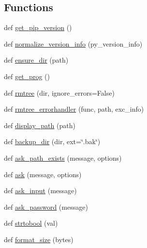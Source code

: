 \subsection*{Functions}
\begin{DoxyCompactItemize}
\item 
def \hyperlink{namespacepip_1_1__internal_1_1utils_1_1misc_a0fe392b2b98197ae4fcf878757c32c71}{get\+\_\+pip\+\_\+version} ()
\item 
def \hyperlink{namespacepip_1_1__internal_1_1utils_1_1misc_a6b617962ff695a9a8dd904b9823f816f}{normalize\+\_\+version\+\_\+info} (py\+\_\+version\+\_\+info)
\item 
def \hyperlink{namespacepip_1_1__internal_1_1utils_1_1misc_afaf6195b8068b1a08c9b6bb51384b7d0}{ensure\+\_\+dir} (path)
\item 
def \hyperlink{namespacepip_1_1__internal_1_1utils_1_1misc_a7385d557b125e0ab0dfdec9a66951838}{get\+\_\+prog} ()
\item 
def \hyperlink{namespacepip_1_1__internal_1_1utils_1_1misc_a468943eb596f19a944215297ab3b9216}{rmtree} (dir, ignore\+\_\+errors=False)
\item 
def \hyperlink{namespacepip_1_1__internal_1_1utils_1_1misc_a68fb568d1b03462b7bcf87103141bedb}{rmtree\+\_\+errorhandler} (func, path, exc\+\_\+info)
\item 
def \hyperlink{namespacepip_1_1__internal_1_1utils_1_1misc_a2c56db5ea4bfcb80d54a94f1eb975454}{display\+\_\+path} (path)
\item 
def \hyperlink{namespacepip_1_1__internal_1_1utils_1_1misc_a77c1deb16207f71d1df9cd37a2af6e80}{backup\+\_\+dir} (dir, ext=\char`\"{}.bak\char`\"{})
\item 
def \hyperlink{namespacepip_1_1__internal_1_1utils_1_1misc_a0a9a745c582de6c64b9f832d515ae17a}{ask\+\_\+path\+\_\+exists} (message, options)
\item 
def \hyperlink{namespacepip_1_1__internal_1_1utils_1_1misc_a58fde5883882cc9ed5d6187ccb0bf074}{ask} (message, options)
\item 
def \hyperlink{namespacepip_1_1__internal_1_1utils_1_1misc_a9ec01c897364c3352bdf608fb36f1f66}{ask\+\_\+input} (message)
\item 
def \hyperlink{namespacepip_1_1__internal_1_1utils_1_1misc_a8e1a385d363d4b5fdc42370dfd017a5d}{ask\+\_\+password} (message)
\item 
def \hyperlink{namespacepip_1_1__internal_1_1utils_1_1misc_a98abe89494768a7d24cda2c624c12600}{strtobool} (val)
\item 
def \hyperlink{namespacepip_1_1__internal_1_1utils_1_1misc_a5539276cb0470f38614f3ca2c19be2e0}{format\+\_\+size} (bytes)

\end{DoxyCompactItemize}
